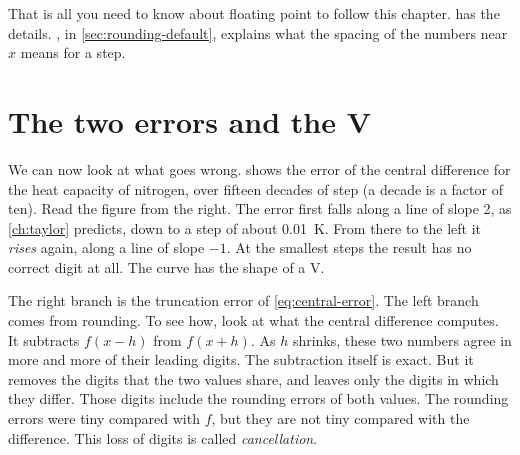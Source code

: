 That is all you need to know about floating point to follow this chapter.  has the details.
, in \cref{sec:rounding-default}, explains what the spacing of the numbers near $x$ means for a step.

\section{The two errors and the V}\label{sec:rounding-v}

We can now look at what goes wrong.  shows the error of the central difference for the heat
capacity of nitrogen, over fifteen decades of step (a decade is a factor of ten). Read the figure from the right.
The error first falls along a line of slope 2, as \cref{ch:taylor} predicts, down to a step of about
\SI{0.01}{\kelvin}. From there to the left it \emph{rises} again, along a line of slope $-1$. At the smallest steps
the result has no correct digit at all. The curve has the shape of a V.

\begin{figure}
\centering

\end{figure}

The right branch is the truncation error of \cref{eq:central-error}. The left branch comes from rounding. To see how,
look at what the central difference computes. It subtracts $f(x - h)$ from $f(x + h)$. As $h$ shrinks, these two
numbers agree in more and more of their leading digits. The subtraction itself is exact. But it removes the digits
that the two values share, and leaves only the digits in which they differ. Those digits include the rounding errors
of both values. The rounding errors were tiny compared with $f$, but they are not tiny compared with the difference.
This loss of digits is called \emph{cancellation}.

